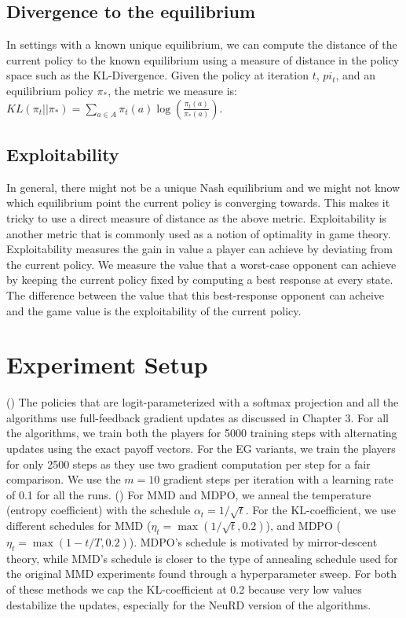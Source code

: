 \subsection{Divergence to the equilibrium}
In settings with a known unique equilibrium, we can compute the distance of the current policy to
the known equilibrium using a measure of distance in the policy space such as the KL-Divergence.
Given the policy at iteration $t$, $pi_t$, and an equilibrium policy $\pi_*$, the metric we measure
is: $KL(\pi_t || \pi_*) = \sum_{a \in A} \pi_t(a) \log \left( \frac{\pi_t(a)}{\pi_*(a)} \right)$.

\subsection{Exploitability}
In general, there might not be a unique Nash equilibrium and we might not know which equilibrium
point the current policy is converging towards.
This makes it tricky to use a direct measure of distance as the above metric.
Exploitability is another metric that is commonly used as a notion of optimality in game theory.
Exploitability measures the gain in value a player can achieve by deviating from the current
policy.
We measure the value that a worst-case opponent can achieve by keeping the current policy fixed by
computing a best response at every state.
The difference between the value that this best-response opponent can acheive and the game value is
the exploitability of the current policy.


\section{Experiment Setup}
 ()
The policies that are logit-parameterized with a softmax projection and all the algorithms use
full-feedback gradient updates as discussed in Chapter 3.
For all the algorithms, we train both the players for 5000 training steps with alternating updates
using the exact payoff vectors.
For the EG variants, we train the players for only 2500 steps as they use two gradient computation
per step for a fair comparison.
We use the $m=10$ gradient steps per iteration with a learning rate of 0.1 for all the runs.
()
For MMD and MDPO, we anneal the temperature (entropy coefficient) with the schedule $\alpha_t =
	1/\sqrt{t}$.
For the KL-coefficient, we use different schedules for MMD ($\eta_t = \max(1 / \sqrt{t}, 0.2)$),
and MDPO ($\eta_t = \max(1 - t/T, 0.2)$).
MDPO's schedule is motivated by mirror-descent theory, while MMD's schedule is closer to the type
of annealing schedule used for the original MMD experiments found through a hyperparameter sweep.
For both of these methods we cap the KL-coefficient at 0.2 because very low values destabilize the
updates, especially for the NeuRD version of the algorithms.

